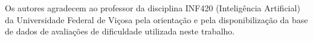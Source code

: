 \documentclass[sigconf]{webmedia}
\begin{document}
\begin{acks}
Os autores agradecem ao professor da disciplina INF420 (Inteligência Artificial) da Universidade Federal de Viçosa pela orientação e pela disponibilização da base de dados de avaliações de dificuldade utilizada neste trabalho.
\end{acks}



\end{document}
